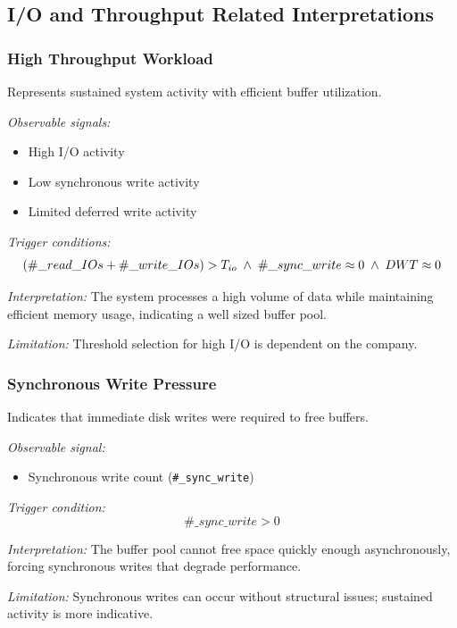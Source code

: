\subsection{I/O and Throughput Related Interpretations}

\subsubsection{High Throughput Workload}

Represents sustained system activity with efficient buffer utilization.

\textit{Observable signals:}
\begin{itemize}
    \item High I/O activity
    \item Low synchronous write activity
    \item Limited deferred write activity
\end{itemize}

\textit{Trigger conditions:}
\[
(\#\_read\_I\/Os + \#\_write\_I\/Os) > T_{io} \;\land\; \#\_sync\_write \approx 0 \;\land\; DWT \approx 0
\]

\textit{Interpretation:}  
The system processes a high volume of data while maintaining efficient memory usage, indicating a well sized buffer pool.

\textit{Limitation:}  
Threshold selection for high I/O is dependent on the company.



\subsubsection{Synchronous Write Pressure}

Indicates that immediate disk writes were required to free buffers.

\textit{Observable signal:}
\begin{itemize}
    \item Synchronous write count (\texttt{\#\_sync\_write})
\end{itemize}



\textit{Trigger condition:}
\[
\#\_sync\_write > 0
\]

\textit{Interpretation:}  
The buffer pool cannot free space quickly enough asynchronously, forcing synchronous writes that degrade performance.

\textit{Limitation:}  
Synchronous writes can occur without structural issues; sustained activity is more indicative.


